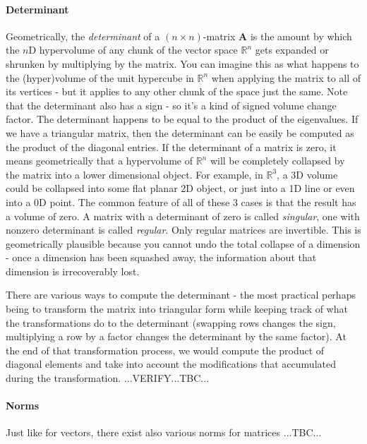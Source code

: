 \paragraph{Determinant}
Geometrically, the \emph{determinant} of a $(n \times n)$-matrix $\mathbf{A}$ is the amount by which the $n$D hypervolume of any chunk of the vector space $\mathbb{R}^n$ gets expanded or shrunken by multiplying by the matrix. You can imagine this as what happens to the (hyper)volume of the unit hypercube in $\mathbb{R}^n$ when applying the matrix to all of its vertices - but it applies to any other chunk of the space just the same. Note that the determinant also has a sign - so it's a kind of signed volume change factor. The determinant happens to be equal to the product of the eigenvalues. If we have a triangular matrix, then the determinant can be easily be computed as the product of the diagonal entries. If the determinant of a matrix is zero, it means geometrically that a hypervolume of $\mathbb{R}^n$ will be completely collapsed by the matrix into a lower dimensional object. For example, in $\mathbb{R}^3$, a 3D volume could be collapsed into some flat planar 2D object, or just into a 1D line or even into a 0D point. The common feature of all of these 3 cases is that the result has a volume of zero. A matrix with a determinant of zero is called \emph{singular}, one with nonzero determinant is called \emph{regular}. Only regular matrices are invertible. This is geometrically plausible because you cannot undo the total collapse of a dimension - once a dimension has been squashed away, the information about that dimension is irrecoverably lost. 

\medskip
There are various ways to compute the determinant - the most practical perhaps being to transform the matrix into triangular form while keeping track of what the transformations do to the determinant (swapping rows changes the sign, multiplying a row by a factor changes the determinant by the same factor). At the end of that transformation process, we would compute the product of diagonal elements and take into account the modifications that accumulated during the transformation. ...VERIFY...TBC...




\paragraph{Norms}
Just like for vectors, there exist also various norms for matrices ...TBC...

